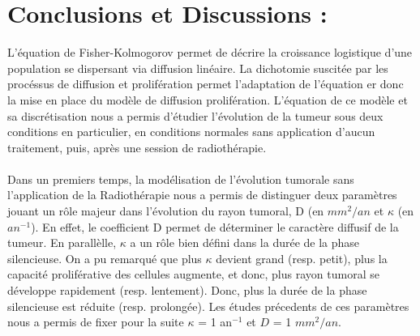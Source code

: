 \documentclass[12pt,a4paper]{article}
\begin{document}
\section{Conclusions et Discussions :}
L'équation de Fisher-Kolmogorov permet de décrire la croissance logistique d'une population se dispersant via diffusion linéaire. La dichotomie suscitée par les procéssus de diffusion et prolifération permet l'adaptation de l'équation er donc la mise en place du modèle de diffusion prolifération. L'équation de ce modèle et sa discrétisation nous a permis d'étudier l'évolution de la tumeur sous deux conditions en particulier, en conditions normales sans application d'aucun traitement, puis, après une session de radiothérapie. 
\\
\\
Dans un premiers temps, la modélisation de l'évolution tumorale sans l'application de la Radiothérapie nous a permis de distinguer deux paramètres jouant un rôle majeur dans l'évolution du rayon tumoral, D (en $mm^2/an$ et $\kappa$ (en $ an^{-1} $). En effet, le coefficient D permet de déterminer le caractère diffusif de la tumeur. En parallèlle, $\kappa$ a un rôle bien défini dans la durée de la phase silencieuse. On a pu remarqué que plus $\kappa$ devient grand (resp. petit), plus la capacité proliférative des cellules augmente, et donc, plus rayon tumoral se développe rapidement (resp. lentement). Donc, plus la durée de la phase silencieuse est réduite (resp. prolongée). Les études précedents de ces paramètres nous a permis de fixer pour la suite $\kappa$ = 1 an$^{-1}$ et $D$ = 1 $mm^2/an $.
\\
\\
\end{document}
